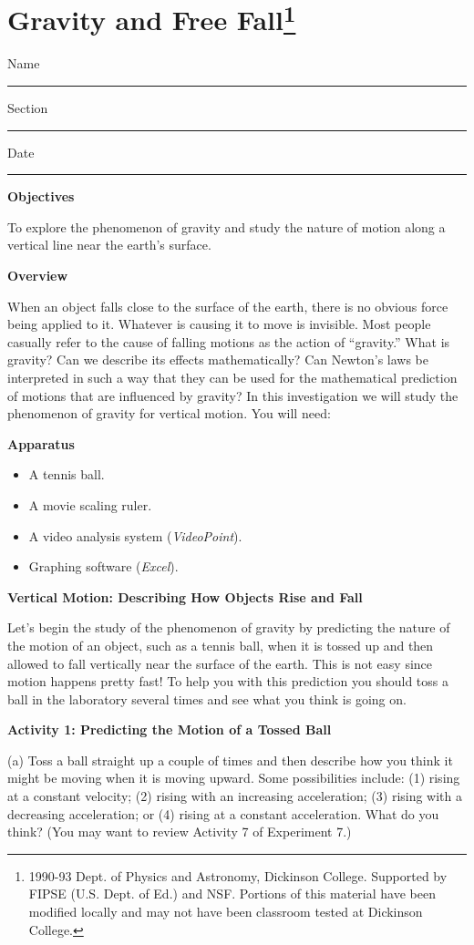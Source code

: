 
\section{Gravity and Free Fall\footnote{
1990-93 Dept. of Physics and Astronomy, Dickinson College. Supported by FIPSE
(U.S. Dept. of Ed.) and NSF. Portions of this material have been modified locally
and may not have been classroom tested at Dickinson College.
}}

Name \rule{2.0in}{0.1pt}\hfill{}Section \rule{1.0in}{0.1pt}\hfill{}Date \rule{1.0in}{0.1pt}

\textbf{Objectives }

To explore the phenomenon of gravity and study the nature of motion along a
vertical line near the earth's surface.

\textbf{Overview }

When an object falls close to the surface of the earth, there is no obvious
force being applied to it. Whatever is causing it to move is invisible. Most
people casually refer to the cause of falling motions as the action of 
``gravity.''
What is gravity? Can we describe its effects mathematically? Can Newton's laws
be interpreted in such a way that they can be used for the mathematical prediction
of motions that are influenced by gravity? In this investigation we will study
the phenomenon of gravity for vertical motion. You will need:

\textbf{Apparatus}

\begin{itemize}
\item A tennis ball. 
\item A movie scaling ruler.
\item A video analysis system (\textit{VideoPoint}). 
\item Graphing software (\textit{Excel}).
\end{itemize}
\textbf{Vertical Motion: Describing How Objects Rise and Fall }

Let's begin the study of the phenomenon of gravity by predicting the nature
of the motion of an object, such as a tennis ball, when it is tossed up and
then allowed to fall vertically near the surface of the earth. This is not easy
since motion happens pretty fast! To help you with this prediction you should
toss a ball in the laboratory several times and see what you think is going
on.

\textbf{Activity 1: Predicting the Motion of a Tossed Ball }

(a) Toss a ball straight up a couple of times and then describe how you think
it might be moving when it is moving upward. Some possibilities include: (1)
rising at a constant velocity; (2) rising with an increasing acceleration; (3)
rising with a decreasing acceleration; or (4) rising at a constant acceleration. What do you think? (You may want to review Activity 7 of Experiment 7.)
\vspace{20mm}

